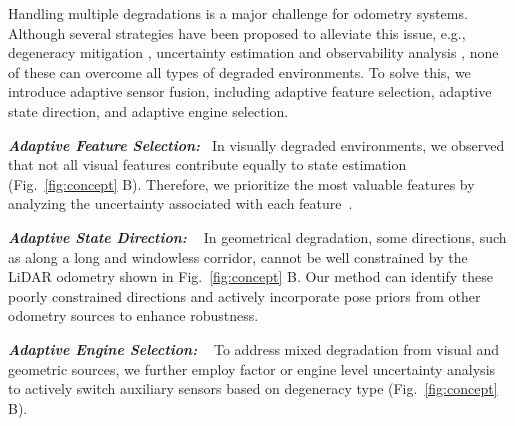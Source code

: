 Handling multiple degradations is a major challenge for odometry systems. 
Although several strategies have been proposed to alleviate this issue, e.g., degeneracy mitigation \cite{tagliabue2021lion,tuna2023x}, uncertainty estimation\cite{talbot2023principled,brossard2020new} and observability analysis \cite{degeneracy,zhen2019estimating,ding2021degeneration,hinduja2019degeneracy,tagliabue2021lion}, none of these can overcome all types of degraded environments.
To solve this, we introduce adaptive sensor fusion, including adaptive feature selection, adaptive state direction, and adaptive engine selection.

\textit{\textbf{Adaptive Feature Selection:}~}
In visually degraded environments, we observed that not all visual features contribute equally to state estimation (Fig.~\ref{fig:concept} B). Therefore, we prioritize the most valuable features by analyzing the uncertainty associated with each feature~\cite{muhle2022probabilistic}.


\textit{\textbf{Adaptive State Direction:} ~}
In geometrical degradation, some directions, such as along a long and windowless corridor, cannot be well constrained by the LiDAR odometry shown in Fig.~\ref{fig:concept} B.
Our method can identify these poorly constrained directions and actively incorporate pose priors from other odometry sources to enhance robustness.

\textit{\textbf{Adaptive Engine Selection:} ~}
To address mixed degradation from visual and geometric sources, we further employ factor or engine level uncertainty analysis to actively switch auxiliary sensors based on degeneracy type (Fig.~\ref{fig:concept} B).




